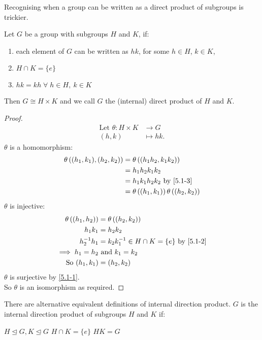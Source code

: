 Recognising when a group can be written as a direct product of subgroups is trickier.

\begin{proposition}
  Let $G$ be a group with subgroups $H$ and $K$, if:
  \begin{enumerate}
    \item each element of $G$ can be written as $hk$, for some $h \in H$, $k \in K$, \label{5.1-1}
    \item $H \cap  K = \{ e \}$ \label{5.1-2}
    \item $hk = kh \; \forall \; h \in H,\ k \in K$ \label{5.1-3}
  \end{enumerate} 
  Then $G \cong H \times K$ and we call $G$ the (internal) direct product of $H$ and $K$.
\end{proposition} 

\begin{proof}
  \begin{align*}
    \text{Let } \theta : H \times K &\to G \\
    (h, k) &\mapsto hk.
  \end{align*} 
  $\theta$ is a homomorphism:
  \begin{align*}
    \theta \left( (h_1, k_1), (h_2, k_2) \right) &= \theta \left( (h_1 h_2, k_1 k_2) \right) \\
    &= h_1 h_2 k_1 k_2 \\
    &= h_1 k_1 h_2 k_2 \text{ by } \ref{5.1-3} \\
    &= \theta \left( (h_1, k_1) \right) \theta \left( (h_2, k_2) \right)
  \end{align*} 
  $\theta$ is injective:
  \begin{align*}
    \theta \left( (h_1, h_2) \right) &= \theta \left( (h_2, k_2) \right) \\
    h_1 k_1 &= h_2 k_2 \\
    h_2^{-1} h_1 &= k_2 k_1^{-1} \in H \cap K = \{ e \} \text{ by } \ref{5.1-2} \\
    \implies h_1 = h_2 &\text{ and } k_1 = k_2 \\
    \text{So } (h_1, k_1) &= (h_2, k_2)
  \end{align*} 
  $\theta$ is surjective by \ref{5.1-1}. \\
  So $\theta$ is an isomorphism as required.
\end{proof} 

\begin{remark}
  There are alternative equivalent definitions of internal direction product.
  $G$ is the internal direction product of subgroups $H$ and $K$ if:
  \begin{symenum}
     $H \trianglelefteq G, K \trianglelefteq G$ \label{5.1-1'}
     $H \cap K = \{ e \}$ \label{5.1-2'}
     $HK = G$ \label{5.1-3'}
  \end{symenum} 
\end{remark} 

